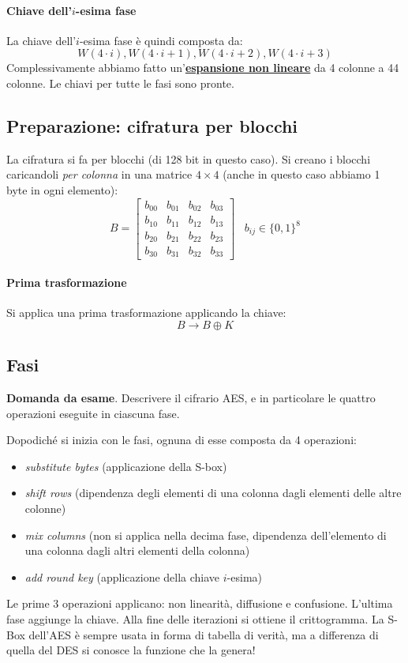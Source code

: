 \paragraph{Chiave dell'$i$-esima fase} La chiave dell'$i$-esima fase è quindi composta da:
$$W(4 \cdot i), W(4 \cdot i + 1), W(4 \cdot i + 2), W(4 \cdot i + 3)$$
Complessivamente abbiamo fatto un'\textbf{\underline{espansione non lineare}} da 4 colonne a 44 colonne. Le chiavi per tutte le fasi sono pronte.

\subsection{Preparazione: cifratura per blocchi}
La cifratura si fa per blocchi (di 128 bit in questo caso).
Si creano i blocchi caricandoli \emph{per colonna} in una matrice $4 \times 4$ (anche in questo caso abbiamo 1 byte in ogni elemento):
$$
B = 
    \begin{bmatrix}
        b_{00} & b_{01} & b_{02} & b_{03} \\
        b_{10} & b_{11} & b_{12} & b_{13} \\
        b_{20} & b_{21} & b_{22} & b_{23} \\
        b_{30} & b_{31} & b_{32} & b_{33}
    \end{bmatrix}
    \,\,\,\,\,b_{ij} \in \{0, 1\}^{8}
$$
\paragraph{Prima trasformazione} Si applica una prima trasformazione applicando la chiave:
$$ B \longrightarrow B \oplus K $$

\subsection{Fasi}
\begin{framed}
	\noindent \textbf{Domanda da esame}. Descrivere il cifrario AES, e in particolare le quattro operazioni eseguite in ciascuna fase.
\end{framed} 
Dopodiché si inizia con le fasi, ognuna di esse composta da 4 operazioni:
\begin{itemize}
    \item \emph{substitute bytes} (applicazione della S-box)
    \item \emph{shift rows} (dipendenza degli elementi di una colonna dagli elementi delle altre colonne)
    \item \emph{mix columns} (non si applica nella decima fase, dipendenza dell'elemento di una colonna dagli altri elementi della colonna)
    \item \emph{add round key} (applicazione della chiave $i$-esima)
\end{itemize}
Le prime 3 operazioni applicano: non linearità, diffusione e confusione. L'ultima fase aggiunge la chiave. Alla fine delle iterazioni si ottiene il crittogramma.
La S-Box dell'AES è sempre usata in forma di tabella di verità, ma a differenza di quella del DES si conosce la funzione che la genera!

